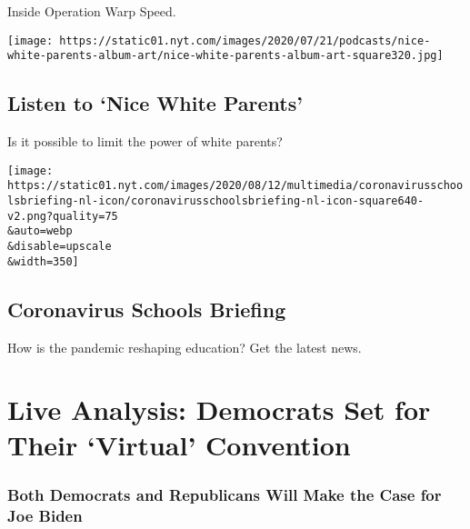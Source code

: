 Inside Operation Warp Speed.

\href{/2020/08/13/podcasts/nice-white-parents-school.html}{}

\texttt{[image: https://static01.nyt.com/images/2020/07/21/podcasts/nice-white-parents-album-art/nice-white-parents-album-art-square320.jpg]}

\href{/2020/08/13/podcasts/nice-white-parents-school.html}{}

\hypertarget{listen-to-nice-white-parents}{%
\subsection{Listen to `Nice White
Parents'}\label{listen-to-nice-white-parents}}

Is it possible to limit the power of white parents?

\href{https://www.nytimes.com/newsletters/coronavirus-schools-briefing}{}

\texttt{[image: https://static01.nyt.com/images/2020/08/12/multimedia/coronavirusschoolsbriefing-nl-icon/coronavirusschoolsbriefing-nl-icon-square640-v2.png?quality=75\\\&auto=webp\\\&disable=upscale\\\&width=350]}

\href{https://www.nytimes.com/newsletters/coronavirus-schools-briefing}{}

\hypertarget{coronavirus-schools-briefing}{%
\subsection{Coronavirus Schools
Briefing}\label{coronavirus-schools-briefing}}

How is the pandemic reshaping education? Get the latest news.

\href{https://www.nytimes.com/interactive/2020/08/17/us/politics/democratic-national-convention-live-stream-analysis.html}{}

\hypertarget{live-analysis-democrats-set-for-their-virtual-convention}{%
\section{Live Analysis: Democrats Set for Their `Virtual'
Convention}\label{live-analysis-democrats-set-for-their-virtual-convention}}

\href{https://www.nytimes.com/interactive/2020/08/17/us/politics/democratic-national-convention-live-stream-analysis.html}{}

\hypertarget{both-democrats-and-republicans-will-make-the-case-for-joe-biden}{%
\subsubsection{Both Democrats and Republicans Will Make the Case for Joe
Biden}\label{both-democrats-and-republicans-will-make-the-case-for-joe-biden}}

